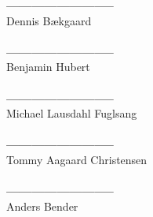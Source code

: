 \indent \textbf{--------------------------}\\
\indent Dennis Bækgaard \\ \\
\indent \textbf{--------------------------}\\
\indent Benjamin Hubert \\ \\
\indent \textbf{--------------------------}\\
\indent Michael Lausdahl Fuglsang \\ \\
\indent \textbf{--------------------------}\\
\indent Tommy Aagaard Christensen \\ \\
\indent \textbf{--------------------------}\\
\indent Anders Bender \\ \\

